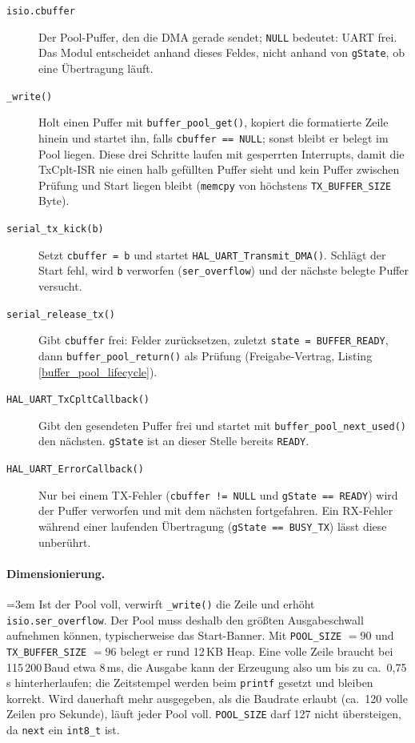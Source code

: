 \begin{description}
\item[\texttt{isio.cbuffer}] Der Pool-Puffer, den die DMA gerade sendet;
  \verb|NULL| bedeutet: UART frei. Das Modul entscheidet anhand dieses Feldes,
  nicht anhand von \verb|gState|, ob eine Übertragung läuft.
\item[\texttt{\_write()}] Holt einen Puffer mit \verb|buffer_pool_get()|,
  kopiert die formatierte Zeile hinein und startet ihn, falls
  \verb|cbuffer == NULL|; sonst bleibt er belegt im Pool liegen. Diese drei
  Schritte laufen mit gesperrten Interrupts, damit die TxCplt-ISR nie einen
  halb gefüllten Puffer sieht und kein Puffer zwischen Prüfung und Start
  liegen bleibt (\verb|memcpy| von höchstens \verb|TX_BUFFER_SIZE| Byte).
\item[\texttt{serial\_tx\_kick(b)}] Setzt \verb|cbuffer = b| und startet
  \verb|HAL_UART_Transmit_DMA()|. Schlägt der Start fehl, wird \verb|b|
  verworfen (\verb|ser_overflow|) und der nächste belegte Puffer versucht.
\item[\texttt{serial\_release\_tx()}] Gibt \verb|cbuffer| frei: Felder
  zurücksetzen, zuletzt \verb|state = BUFFER_READY|, dann
  \verb|buffer_pool_return()| als Prüfung (Freigabe-Vertrag, Listing
  \ref{buffer_pool_lifecycle}).
\item[\texttt{HAL\_UART\_TxCpltCallback()}] Gibt den gesendeten Puffer frei und
  startet mit \verb|buffer_pool_next_used()| den nächsten. \verb|gState| ist
  an dieser Stelle bereits \verb|READY|.
\item[\texttt{HAL\_UART\_ErrorCallback()}] Nur bei einem TX-Fehler
  (\verb|cbuffer != NULL| und \verb|gState == READY|) wird der Puffer
  verworfen und mit dem nächsten fortgefahren. Ein RX-Fehler während einer
  laufenden Übertragung (\verb|gState == BUSY_TX|) lässt diese unberührt.
\end{description}

\paragraph{Dimensionierung.}
{\sloppy\emergencystretch=3em
Ist der Pool voll, verwirft \verb|_write()| die Zeile und erhöht
\verb|isio.ser_overflow|. Der Pool muss deshalb den größten
Ausgabeschwall aufnehmen können, typischerweise das Start-Banner. Mit
\verb|POOL_SIZE| $= 90$ und \verb|TX_BUFFER_SIZE| $= 96$ belegt er rund
12\,KB Heap. Eine volle Zeile braucht bei 115\,200\,Baud etwa 8\,ms, die
Ausgabe kann der Erzeugung also um bis zu ca.\ 0{,}75\,s hinterherlaufen; die
Zeitstempel werden beim \verb|printf| gesetzt und bleiben korrekt. Wird
dauerhaft mehr ausgegeben, als die Baudrate erlaubt (ca.\ 120 volle Zeilen
pro Sekunde), läuft jeder Pool voll. \verb|POOL_SIZE| darf 127 nicht
übersteigen, da \verb|next| ein \verb|int8_t| ist.
\par}

